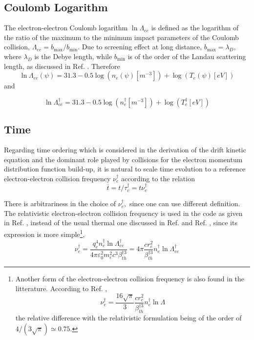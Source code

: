 \subsection{Coulomb Logarithm}

The electron-electron Coulomb logarithm $\ln \Lambda _{ee}$ is defined as
the logarithm of the ratio of the maximum to the minimum impact parameters
of the Coulomb collision, $\Lambda _{ee}=b_{\max }/b_{\min }$. Due to
screening effect at long distance,  $b_{\max }=\lambda _{D},$ where $\lambda
_{D}$ is the Debye length, while $b_{\min }$ is of the order of the Landau
scattering length, as discussed in Ref. \cite{wes04}. Therefore%
\begin{equation}
\ln \Lambda _{ee}\left( \psi \right) =31.3-0.5\log (n_{e}\left( \psi \right) 
\left[ m^{-3}\right] )+\log (T_{e}\left( \psi \right) \left[ eV\right] )
\end{equation}%
and 

\begin{equation}
\ln \Lambda _{ee}^{\dag }=31.3-0.5\log (n_{e}^{\dag }\left[ m^{-3}\right]
)+\log (T_{e}^{\dag }\left[ eV\right] )
\end{equation}

\subsection{Time}

Regarding time ordering which is considered in the derivation of the drift
kinetic equation and the dominant role played by collisions for the electron
momentum distribution function build-up, it is natural to scale time
evolution to a reference electron-electron collision frequency $\nu
_{e}^{\dag }$ according to the relation 
\begin{equation}
\overline{t}=t/\tau _{c}^{\dag }=t\nu _{e}^{\dag }
\end{equation}

There is arbitrariness in the choice of $\nu _{e}^{\dag },$ since one can
use different definition. The relativistic electron-electron collision
frequency is used in the code as given in Ref. \cite{bra98}, instead of the
usual thermal one discussed in Ref.\cite{wes04} and Ref.\cite{hel02} , since
its expression is more simple\footnote{%
Another form of the electron-electron collision frequency is also found in
the litterature. According to Ref. \cite{hel02} , 
\begin{equation*}
\nu _{e}^{\dag }=\frac{16\sqrt{\pi }}{3}\frac{cr_{e}^{2}}{\beta _{th}^{\dag
3}}n_{e}^{\dag }\ln \Lambda 
\end{equation*}%
the relative difference with the relativistic formulation being of the order
of $4/\left( 3\sqrt{\pi }\right) \simeq 0.75.$ }, 
\begin{equation}
\nu _{e}^{\dag }=\frac{q_{e}^{4}n_{e}^{\dag }\ln \Lambda _{ee}^{\dag }}{4\pi
\varepsilon _{0}^{2}m_{e}^{2}c^{3}\beta _{th}^{\dag 3}}=4\pi \frac{cr_{e}^{2}%
}{\beta _{th}^{\dag 3}}n_{e}^{\dag }\ln \Lambda _{ee}^{\dag }
\label{normcollfreq}
\end{equation}

